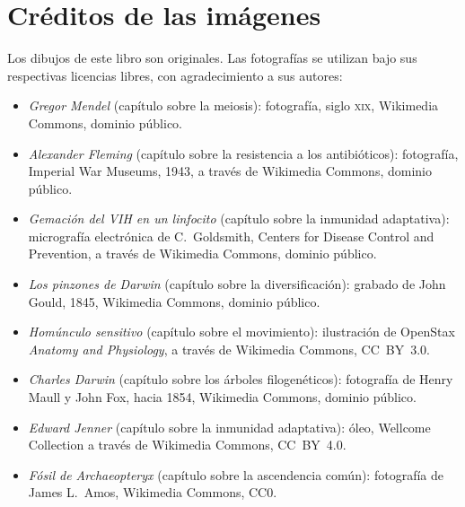 \chapter*{Créditos de las imágenes}

\begingroup\sloppy

Los dibujos de este libro son originales. Las fotografías se utilizan
bajo sus respectivas licencias libres, con agradecimiento a sus
autores:

\begin{itemize}
  \item \emph{Gregor Mendel} (capítulo sobre la meiosis): fotografía,
        siglo \textsc{xix}, Wikimedia Commons, dominio público.
  \item \emph{Alexander Fleming} (capítulo sobre la resistencia a los
        antibióticos): fotografía, Imperial War Museums, 1943, a
        través de Wikimedia Commons, dominio público.
  \item \emph{Gemación del VIH en un linfocito} (capítulo sobre la
        inmunidad adaptativa): micrografía electrónica de
        C.~Goldsmith, Centers for Disease Control and Prevention, a
        través de Wikimedia Commons, dominio público.
  \item \emph{Los pinzones de Darwin} (capítulo sobre la
        diversificación): grabado de John Gould, 1845, Wikimedia
        Commons, dominio público.
  \item \emph{Homúnculo sensitivo} (capítulo sobre el movimiento):
        ilustración de OpenStax \emph{Anatomy and Physiology}, a
        través de Wikimedia Commons, CC~BY~3.0.
  \item \emph{Charles Darwin} (capítulo sobre los árboles
        filogenéticos): fotografía de Henry Maull y John Fox, hacia
        1854, Wikimedia Commons, dominio público.
  \item \emph{Edward Jenner} (capítulo sobre la inmunidad adaptativa):
        óleo, Wellcome Collection a través de Wikimedia Commons,
        CC~BY~4.0.
  \item \emph{Fósil de Archaeopteryx} (capítulo sobre la ascendencia
        común): fotografía de James L.~Amos, Wikimedia Commons, CC0.
\end{itemize}

